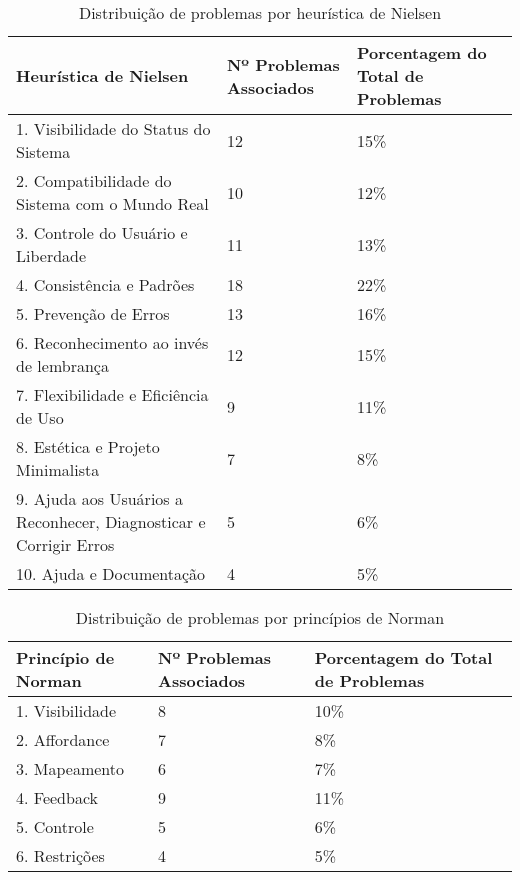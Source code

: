 \begin{table}[H]
    \centering
    \tiny
    \begin{tabular}{|m{6cm}|m{4cm}|m{4cm}|}
        \hline
        \textbf{Heurística de Nielsen} & \textbf{Nº Problemas Associados} & \textbf{Porcentagem do Total de Problemas} \\
        \hline
        1. Visibilidade do Status do Sistema & 12 & 15\% \\
        \hline
        2. Compatibilidade do Sistema com o Mundo Real & 10 & 12\% \\
        \hline
        3. Controle do Usuário e Liberdade & 11 & 13\% \\
        \hline
        4. Consistência e Padrões & 18 & 22\% \\
        \hline
        5. Prevenção de Erros & 13 & 16\% \\
        \hline
        6. Reconhecimento ao invés de lembrança & 12 & 15\% \\
        \hline
        7. Flexibilidade e Eficiência de Uso & 9 & 11\% \\
        \hline
        8. Estética e Projeto Minimalista & 7 & 8\% \\
        \hline
        9. Ajuda aos Usuários a Reconhecer, Diagnosticar e Corrigir Erros & 5 & 6\% \\
        \hline
        10. Ajuda e Documentação & 4 & 5\% \\
        \hline
    \end{tabular}
    \caption{Distribuição de problemas por heurística de Nielsen}
    \label{tab:problemas-heuristicas-nielsen}
\end{table}

\begin{table}[H]
    \centering
    \tiny
    \begin{tabular}{|m{6cm}|m{4cm}|m{4cm}|}
        \hline
        \textbf{Princípio de Norman} & \textbf{Nº Problemas Associados} & \textbf{Porcentagem do Total de Problemas} \\
        \hline
        1. Visibilidade & 8 & 10\% \\
        \hline
        2. Affordance & 7 & 8\% \\
        \hline
        3. Mapeamento & 6 & 7\% \\
        \hline
        4. Feedback & 9 & 11\% \\
        \hline
        5. Controle & 5 & 6\% \\
        \hline
        6. Restrições & 4 & 5\% \\
        \hline
    \end{tabular}
    \caption{Distribuição de problemas por princípios de Norman}
    \label{tab:problemas-principios-norman}
\end{table}
